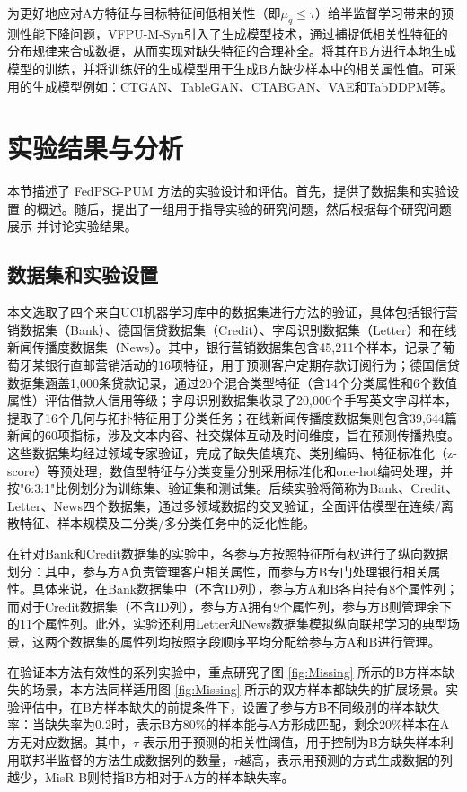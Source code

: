 为更好地应对A方特征与目标特征间低相关性（即$\mu_q \leq \tau$）给半监督学习带来的预测性能下降问题，VFPU-M-Syn引入了生成模型技术，通过捕捉低相关性特征的分布规律来合成数据，从而实现对缺失特征的合理补全。将其在B方进行本地生成模型的训练，并将训练好的生成模型用于生成B方缺少样本中的相关属性值。可采用的生成模型例如：CTGAN、TableGAN、CTABGAN、VAE和TabDDPM等。
\section{实验结果与分析}
本节描述了 FedPSG-PUM 方法的实验设计和评估。首先，提供了数据集和实验设置 的概述。随后，提出了一组用于指导实验的研究问题，然后根据每个研究问题展示 并讨论实验结果。
\subsection{数据集和实验设置} \label{subsec:data_experiment}
本文选取了四个来自UCI机器学习库中的数据集进行方法的验证，具体包括银行营销数据集（Bank）、德国信贷数据集（Credit）、字母识别数据集（Letter）和在线新闻传播度数据集（News）。其中，银行营销数据集包含45,211个样本，记录了葡萄牙某银行直邮营销活动的16项特征，用于预测客户定期存款订阅行为；德国信贷数据集涵盖1,000条贷款记录，通过20个混合类型特征（含14个分类属性和6个数值属性）评估借款人信用等级；字母识别数据集收录了20,000个手写英文字母样本，提取了16个几何与拓扑特征用于分类任务；在线新闻传播度数据集则包含39,644篇新闻的60项指标，涉及文本内容、社交媒体互动及时间维度，旨在预测传播热度。这些数据集均经过领域专家验证，完成了缺失值填充、类别编码、特征标准化（z-score）等预处理，数值型特征与分类变量分别采用标准化和one-hot编码处理，并按"6:3:1"比例划分为训练集、验证集和测试集。后续实验将简称为Bank、Credit、Letter、News四个数据集，通过多领域数据的交叉验证，全面评估模型在连续/离散特征、样本规模及二分类/多分类任务中的泛化性能。

在针对Bank和Credit数据集的实验中，各参与方按照特征所有权进行了纵向数据划分：其中，参与方A负责管理客户相关属性，而参与方B专门处理银行相关属性。具体来说，在Bank数据集中（不含ID列），参与方A和B各自持有8个属性列；而对于Credit数据集（不含ID列），参与方A拥有9个属性列，参与方B则管理余下的11个属性列。此外，实验还利用Letter和News数据集模拟纵向联邦学习的典型场景，这两个数据集的属性列均按照字段顺序平均分配给参与方A和B进行管理。

在验证本方法有效性的系列实验中，重点研究了图 \ref{fig:Missing} 所示的B方样本缺失的场景，本方法同样适用图 \ref{fig:Missing} 所示的双方样本都缺失的扩展场景。实验评估中，在B方样本缺失的前提条件下，设置了参与方B不同级别的样本缺失率：当缺失率为0.2时，表示B方80\%的样本能与A方形成匹配，剩余20\%样本在A方无对应数据。其中，$\tau$ 表示用于预测的相关性阈值，用于控制为B方缺失样本利用联邦半监督的方法生成数据列的数量，$\tau$越高，表示用预测的方式生成数据的列越少，MisR-B则特指B方相对于A方的样本缺失率。
